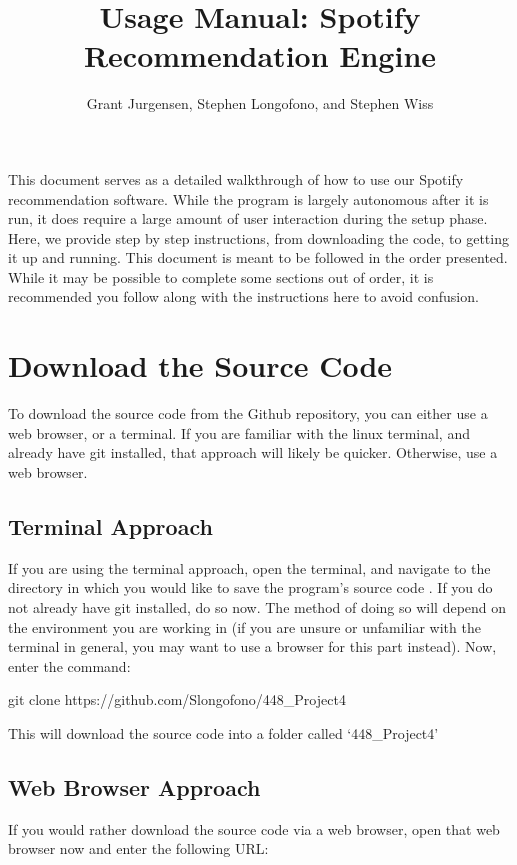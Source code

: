\documentclass{roffin}
\begin{document}
\title{Usage Manual: Spotify Recommendation Engine}

\author{Grant Jurgensen, Stephen Longofono, and Stephen Wiss}

\maketitle

This document serves as a detailed walkthrough of how to use our Spotify recommendation software. While the program is largely autonomous after it is run, it does require a large amount of user interaction during the setup phase. Here, we provide step by step instructions, from downloading the code, to getting it up and running. This document is meant to be followed in the order presented. While it may be possible to complete some sections out of order, it is recommended you follow along with the instructions here to avoid confusion.


\section{Download the Source Code}
To download the source code from the Github repository, you can either use a web browser, or a terminal. If you are familiar with the linux terminal, and already have git installed, that approach will likely be quicker. Otherwise, use a web browser.

\subsection{Terminal Approach}
If you are using the terminal approach, open the terminal, and navigate to the directory in which you would like to save the program's source code . If you do not already have git installed, do so now. The method of doing so will depend on the environment you are working in (if you are unsure or unfamiliar with the terminal in general, you may want to use a browser for this part instead). Now, enter the command:
\newline

\hspace{1cm} git clone https://github.com/Slongofono/448\_Project4

\hfill
\newline
This will download the source code into a folder called `448\_Project4' 

\subsection{Web Browser Approach}
If you would rather download the source code via a web browser, open that web browser now and enter the following URL: 
\newline
\end{document}
